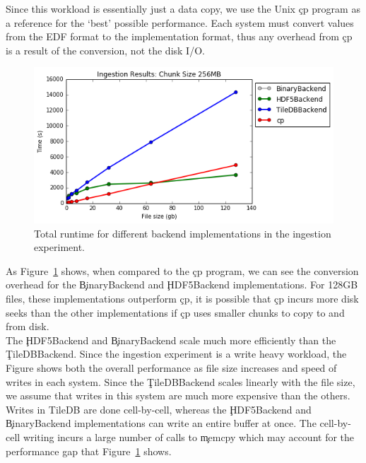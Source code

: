 Since this workload is essentially just a data copy, we use the Unix \c{cp}
program as a reference for the `best' possible performance. Each system must
convert values from the EDF format to the implementation format, thus any
overhead from \c{cp} is a result of the conversion, not the disk I/O. \\

\begin{figure}[h]
\begin{center}
\includegraphics[scale=.75]{./img/ingestion-exp.png}
\caption{Total runtime for different backend implementations in the ingestion
  experiment.}
\label{fig:ingestion-exp}
\end{center}
\end{figure}

As Figure~\ref{fig:ingestion-exp} shows, when compared to the \c{cp} program,
we can see the conversion overhead for the \c{BinaryBackend} and
\c{HDF5Backend} implementations. For 128GB files, these implementations
outperform \c{cp}, it is possible that \c{cp} incurs more disk seeks than the
other implementations if \c{cp} uses smaller chunks to copy to and from disk.
\\

The \c{HDF5Backend} and \c{BinaryBackend} scale much more efficiently than the
\c{TileDBBackend}. Since the ingestion experiment is a write heavy workload,
the Figure shows both the overall performance as file size increases and speed
of writes in each system.  Since the \c{TileDBBackend} scales linearly with the
file size, we assume that writes in this system are much more expensive than
the others. \\

Writes in TileDB are done cell-by-cell, whereas the \c{HDF5Backend} and
\c{BinaryBackend} implementations can write an entire buffer at once. The
cell-by-cell writing incurs a large number of calls to \c{memcpy} which may
account for the performance gap that Figure~\ref{fig:ingestion-exp} shows. \\

